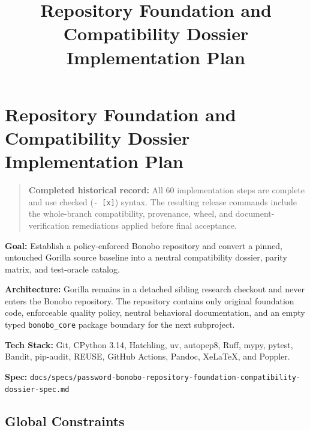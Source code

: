 \documentclass[
  letterpaper,
]{article}
\title{Repository Foundation and Compatibility Dossier Implementation Plan}
\author{}
\date{}
\newcommand{\passthrough}[1]{#1}
\begin{document}
\maketitle

{
\setcounter{tocdepth}{3}
\tableofcontents
}
\section{Repository Foundation and Compatibility Dossier Implementation
Plan}\label{repository-foundation-and-compatibility-dossier-implementation-plan}

\begin{quote}
\textbf{Completed historical record:} All 60 implementation steps are complete and use checked
(\passthrough{\lstinline!- [x]!}) syntax. The resulting release commands include the whole-branch compatibility,
provenance, wheel, and document-verification remediations applied before final acceptance.
\end{quote}

\textbf{Goal:} Establish a policy-enforced Bonobo repository and convert a pinned, untouched Gorilla source baseline
into a neutral compatibility dossier, parity matrix, and test-oracle catalog.

\textbf{Architecture:} Gorilla remains in a detached sibling research checkout and never enters the Bonobo repository.
The repository contains only original foundation code, enforceable quality policy, neutral behavioral documentation, and
an empty typed \nolinkurl{bonobo_core} package boundary for the next subproject.

\textbf{Tech Stack:} Git, CPython 3.14, Hatchling, uv, autopep8, Ruff, mypy, pytest, Bandit, pip-audit, REUSE, GitHub
Actions, Pandoc, XeLaTeX, and Poppler.

\textbf{Spec:} \nolinkurl{docs/specs/password-bonobo-repository-foundation-compatibility-dossier-spec.md}

\subsection{Global Constraints}\label{global-constraints}
\end{document}
